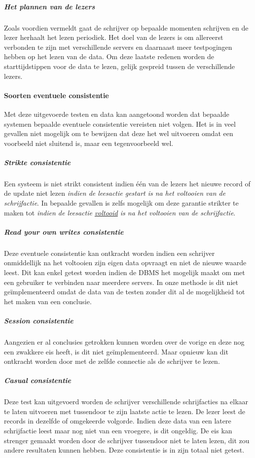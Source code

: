 \subparagraph{Het plannen van de lezers} Zoals voordien vermeldt gaat de schrijver op bepaalde momenten schrijven en de lezer herhaalt het lezen periodiek. Het doel van de lezers is om allereerst verbonden te zijn met verschillende servers en daarnaast meer testpogingen hebben op het lezen van de data. Om deze laatste redenen worden de starttijdstippen voor de data te lezen, gelijk gespreid tussen de verschillende lezers. 

\paragraph{Soorten eventuele consistentie} Met deze uitgevoerde testen en data kan aangetoond worden dat bepaalde systemen bepaalde eventuele consistentie vereisten niet volgen. Het is in veel gevallen niet mogelijk om te bewijzen dat deze het wel uitvoeren omdat een voorbeeld niet sluitend is, maar een tegenvoorbeeld wel. 

\subparagraph{Strikte consistentie} Een systeem is niet strikt consistent indien één van de lezers het nieuwe record of de update niet lezen \textit{indien de leesactie gestart is na het voltooien van de schrijfactie}. In bepaalde gevallen is zelfs mogelijk om deze garantie strikter te maken tot \textit{indien de leesactie \underline{voltooid} is na het voltooien van de schrijfactie}. 

\subparagraph{Read your own writes consistentie} Deze eventuele consistentie kan ontkracht worden indien een schrijver onmiddellijk na het voltooien zijn eigen data opvraagt en niet de nieuwe waarde leest. Dit kan enkel getest worden indien de DBMS het mogelijk maakt om met een gebruiker te verbinden naar meerdere servers.  In onze methode is dit niet geïmplementeerd omdat de data van de testen zonder dit al de mogelijkheid tot het maken van een conclusie.  

\subparagraph{Session consistentie} Aangezien er al conclusies getrokken kunnen worden over de vorige en deze nog een zwakkere eis heeft, is dit niet geïmplementeerd. Maar opnieuw kan dit ontkracht worden door met de zelfde connectie als de schrijver te lezen. 

\subparagraph{Casual consistentie} Deze test kan uitgevoerd worden de schrijver verschillende schrijfacties na elkaar te laten uitvoeren met tussendoor te zijn laatste actie te lezen. De lezer leest de records in dezelfde of omgekeerde volgorde. Indien deze data van een latere schrijfactie leest maar nog niet van een vroegere, is dit ongeldig. De eis kan strenger gemaakt worden door de schrijver tussendoor niet te laten lezen, dit zou andere resultaten kunnen hebben. Deze consistentie is in zijn totaal niet getest. 

